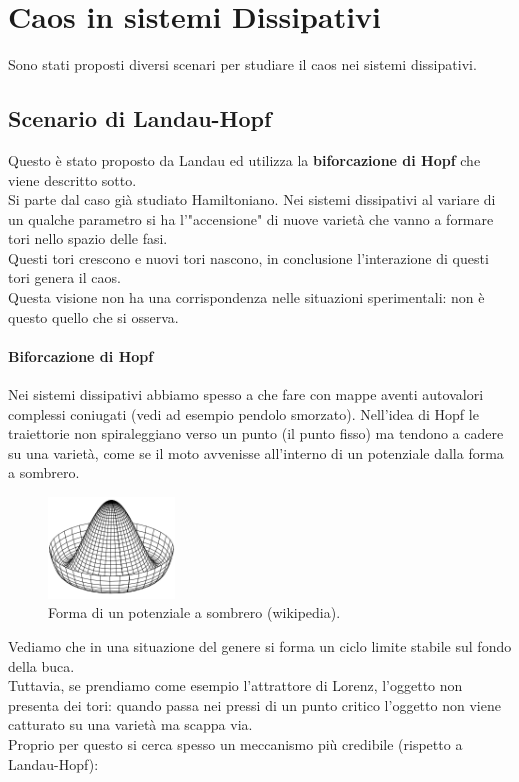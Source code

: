 \section{Caos in sistemi Dissipativi}%
\label{sub:Lezione 23}
\mylocaltoc
Sono stati proposti diversi scenari per studiare il caos nei sistemi dissipativi.
\subsection{Scenario di Landau-Hopf}%
\label{sub:Scenario di Landau-Hopf}
Questo è stato proposto da Landau ed utilizza la \textbf{biforcazione di Hopf} che viene descritto sotto.\\
Si parte dal caso già studiato Hamiltoniano. Nei sistemi dissipativi al variare di un qualche parametro si ha l'"accensione" di nuove varietà che vanno a formare tori nello spazio delle fasi.\\ 
Questi tori crescono e nuovi tori nascono, in conclusione l'interazione di questi tori genera il caos. \\
Questa visione non ha una corrispondenza nelle situazioni sperimentali: non è questo quello che si osserva.
\paragraph{Biforcazione di Hopf}%
\label{par:Biforcazione di Hopf}
Nei sistemi dissipativi abbiamo spesso a che fare con mappe aventi autovalori complessi coniugati (vedi ad esempio pendolo smorzato). Nell'idea di Hopf le traiettorie non spiraleggiano verso un punto (il punto fisso) ma tendono a cadere su una varietà, come se il moto avvenisse all'interno di un potenziale dalla forma a sombrero. 
\begin{figure}[H]
    \centering
    \includegraphics[width=0.3\textwidth]{figures/sombrero.png}
    \caption{\scriptsize Forma di un potenziale a sombrero (wikipedia).}
    \label{fig:figures-sombrero-png}
\end{figure}
\noindent
Vediamo che in una situazione del genere si forma un ciclo limite stabile sul fondo della buca.\\
Tuttavia, se prendiamo come esempio l'attrattore di Lorenz, l'oggetto non presenta dei tori: quando passa nei pressi di un punto critico l'oggetto non viene catturato su una varietà ma scappa via.\\
Proprio per questo si cerca spesso un meccanismo più credibile (rispetto a Landau-Hopf): 
